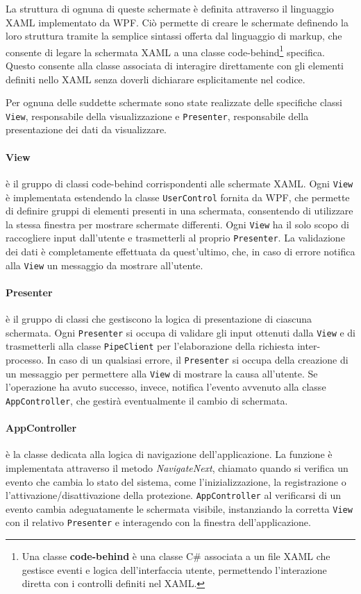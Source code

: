 \documentclass[12pt,a4paper,openright,twoside]{book}
\newcommand{\class}[1]{\texttt{#1}}
\newcommand{\cs}{C\# }
\begin{document}
La struttura di ognuna di queste schermate è definita attraverso il linguaggio XAML implementato da WPF.
Ciò permette di creare le schermate definendo la loro struttura tramite la semplice sintassi offerta dal linguaggio di markup, che consente di legare la schermata XAML a una classe code-behind\footnote{Una classe \textbf{code-behind} è una classe \cs associata a un file XAML che gestisce eventi e logica dell'interfaccia utente, permettendo l'interazione diretta con i controlli definiti nel XAML.} specifica.
Questo consente alla classe associata di interagire direttamente con gli elementi definiti nello XAML senza doverli dichiarare esplicitamente nel codice.

Per ognuna delle suddette schermate sono state realizzate delle specifiche classi \class{View}, responsabile della visualizzazione e \class{Presenter}, responsabile della presentazione dei dati da visualizzare.

\paragraph{View} è il gruppo di classi code-behind corrispondenti alle schermate XAML.
Ogni \class{View} è implementata estendendo la classe \class{UserControl} fornita da \gls{WPF}, che permette di definire gruppi di elementi presenti in una schermata, consentendo di utilizzare la stessa finestra per mostrare schermate differenti.
Ogni \class{View} ha il solo scopo di raccogliere input dall'utente e trasmetterli al proprio \class{Presenter}.
La validazione dei dati è completamente effettuata da quest'ultimo, che, in caso di errore notifica alla \class{View} un messaggio da mostrare all'utente.

\paragraph{Presenter} è il gruppo di classi che gestiscono la logica di presentazione di ciascuna schermata.
Ogni \class{Presenter} si occupa di validare gli input ottenuti dalla \class{View} e di trasmetterli alla classe \class{PipeClient} per l'elaborazione della richiesta inter-processo.
In caso di un qualsiasi errore, il \class{Presenter} si occupa della creazione di un messaggio per permettere alla \class{View} di mostrare la causa all'utente.
Se l'operazione ha avuto successo, invece, notifica l'evento avvenuto alla classe \class{AppController}, che gestirà eventualmente il cambio di schermata.

\paragraph{AppController} è la classe dedicata alla logica di navigazione dell'applicazione. 
La funzione è implementata attraverso il metodo \textit{NavigateNext}, chiamato quando si verifica un evento che cambia lo stato del sistema, come l'inizializzazione, la registrazione o l'attivazione/disattivazione della protezione.
\class{AppController} al verificarsi di un evento cambia adeguatamente le schermata visibile, instanziando la corretta \class{View} con il relativo \class{Presenter} e interagendo con la finestra dell'applicazione.
\end{document}
